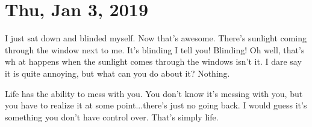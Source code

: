 \section{Thu, Jan 3, 2019}

I just sat down and blinded myself. Now that's awesome. There's sunlight coming
through the window next to me. It's blinding I tell you! Blinding! Oh well, that's wh
at happens when the sunlight comes through the windows isn't it. I dare say it is
quite annoying, but what can you do about it? Nothing.

Life has the ability to mess with you. You don't know it's messing with you, but you
have to realize it at some point...there's just no going back. I would guess it's
something you don't have control over. That's simply life.